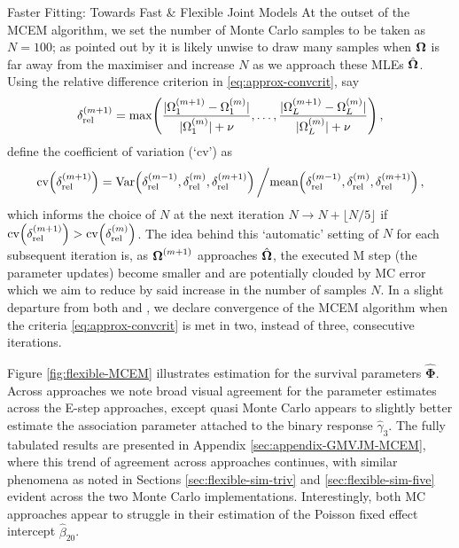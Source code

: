 \begin{chapter}{\label{cha:flexible}Faster Fitting: Towards Fast \& Flexible Joint Models}
At the outset of the MCEM algorithm, we set the number of Monte Carlo samples to be taken as $N=100$; as pointed out by \citet{Ripatti2002} it is likely unwise to draw many samples when $\bm{\mathrm{\Omega}}$ is far away from the maximiser and increase $N$ as we approach these MLEs $\hat{\bm{\Omega}}$. Using the relative difference criterion in \eqref{eq:approx-convcrit}, say
\begin{align*}
    \delta_{\mathrm{rel}}^{(m+1)} = \max\!\left(\frac{|\Omega^{(m+1)}_1-\Omega^{(m)}_1|}{|\Omega^{(m)}_1|+\nu},\dots, 
                                           \frac{|\Omega^{(m+1)}_L-\Omega^{(m)}_L|}{|\Omega^{(m)}_L|+\nu}\right),
\end{align*}
\citet{Ripatti2002} define the coefficient of variation (`cv') as
\begin{align*}
    \mathrm{cv}\!\left(\delta^{(m+1)}_{\mathrm{rel}}\right) = \mathrm{Var}\!\left( \delta^{(m-1)}_{\mathrm{rel}}, \delta^{(m)}_{\mathrm{rel}}, \delta^{(m+1)}_{\mathrm{rel}}\right)\bigg/\mathrm{mean}\!\left( \delta^{(m-1)}_{\mathrm{rel}}, \delta^{(m)}_{\mathrm{rel}}, \delta^{(m+1)}_{\mathrm{rel}}\right),
\end{align*}
which informs the choice of $N$ at the next iteration $N\rightarrow N+\lfloor N/5\rfloor$ if $\mathrm{cv}\!\left(\delta^{(m+1)}_{\mathrm{rel}}\right)>\mathrm{cv}\!\left(\delta^{(m)}_{\mathrm{rel}}\right)$. The idea behind this `automatic' setting of $N$ for each subsequent iteration is, as $\bm{\mathrm{\Omega}}^{(m+1)}$ approaches $\hat{\bm{\Omega}}$, the executed M step (\ie the parameter updates) become smaller and are potentially clouded by MC error which we aim to reduce by said increase in the number of samples $N$. In a slight departure from both \citet{Ripatti2002} and \citet{Hickey2018}, we declare convergence of the MCEM algorithm when the criteria \eqref{eq:approx-convcrit} is met in two, instead of three, consecutive iterations.

Figure \ref{fig:flexible-MCEM} illustrates estimation for the survival parameters $\hat{\bm{\Phi}}$. Across approaches we note broad visual agreement for the parameter estimates across the E-step approaches, except quasi Monte Carlo appears to slightly better estimate the association parameter attached to the binary response $\hat{\gamma}_3$. The fully tabulated results are presented in Appendix \ref{sec:appendix-GMVJM-MCEM}, where this trend of agreement across approaches continues, with similar phenomena as noted in \eg Sections \ref{sec:flexible-sim-triv} and \ref{sec:flexible-sim-five} evident across the two Monte Carlo implementations. Interestingly, both MC approaches appear to struggle in their estimation of the Poisson fixed effect intercept $\hat{\beta}_{20}$. 


\end{chapter}
